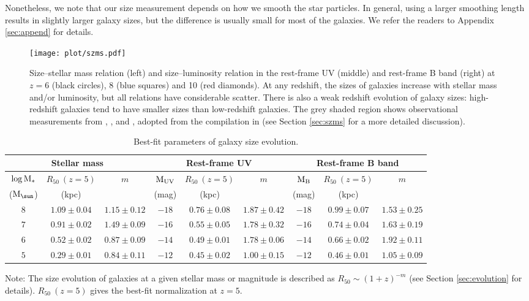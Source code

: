 \documentclass[useAMS,usenatbib]{mn2e}
\newcommand{\Ms}{{\rm M}_{\ast}}
\newcommand{\Msun}{{\rm M}_{\sun}}
\begin{document}
Nonetheless, we note that our size measurement depends on how we smooth the star particles. In general, using a larger smoothing length results in slightly larger galaxy sizes, but the difference is usually small for most of the galaxies. We refer the readers to Appendix \ref{sec:append} for details.

\begin{figure*}
\centering
\texttt{[image: plot/szms.pdf]}
\caption{Size--stellar mass relation (left) and size--luminosity relation in the rest-frame UV (middle) and rest-frame B band (right) at $z=6$ (black circles), 8 (blue squares) and 10 (red diamonds). At any redshift, the sizes of galaxies increase with stellar mass and/or luminosity, but all relations have considerable scatter. There is also a weak redshift evolution of galaxy sizes: high-redshift galaxies tend to have smaller sizes than low-redshift galaxies. The grey shaded region shows observational measurements from \citet{ono.2013:size.evolution.udf12}, \citet{kawamata.2015:hff.size.z6to8}, and \citet{bouwens.2017:small.galaxy.sizes}, adopted from the compilation in \citealt{bouwens.2017:small.galaxy.sizes} (see Section \ref{sec:szms} for a more detailed discussion).}
\label{fig:szms}
\end{figure*}

\begin{table*}
\caption{Best-fit parameters of galaxy size evolution.}
\begin{threeparttable}
\begin{tabular}{ccccccccc}
\hline
\multicolumn{3}{c}{Stellar mass} & \multicolumn{3}{c}{Rest-frame UV} & \multicolumn{3}{c}{Rest-frame B band} \\
\hline
$\log\Ms$ & $R_{50}~(z=5)$ & $m$ & $\rm M_{UV}$ & $R_{50}~(z=5)$ & $m$ & 
$\rm M_B$ & $R_{50}~(z=5)$ & $m$ \\
($\Msun$) & (kpc) & & (mag) & (kpc) & & (mag) & (kpc) & \\
\hline
$8$ & $1.09\pm0.04$ & $1.15\pm0.12$ & $-18$ & $0.76\pm0.08$ & $1.87\pm0.42$ & 
$-18$ & $0.99\pm0.07$ & $1.53\pm0.25$ \\
$7$ & $0.91\pm0.02$ & $1.49\pm0.09$ & $-16$ & $0.55\pm0.05$ & $1.78\pm0.32$ & 
$-16$ & $0.74\pm0.04$ & $1.63\pm0.19$ \\
$6$ & $0.52\pm0.02$ & $0.87\pm0.09$ & $-14$ & $0.49\pm0.01$ & $1.78\pm0.06$ & 
$-14$ & $0.66\pm0.02$ & $1.92\pm0.11$ \\
$5$ & $0.29\pm0.01$ & $0.84\pm0.11$ & $-12$ & $0.45\pm0.02$ & $1.00\pm0.15$ & 
$-12$ & $0.46\pm0.01$ & $1.05\pm0.09$ \\
\hline
\end{tabular}
\begin{tablenotes}
\item Note: The size evolution of galaxies at a given stellar mass or magnitude is described as $R_{50}\sim(1+z)^{-m}$ (see Section \ref{sec:evolution} for details). $R_{50}~(z=5)$ gives the best-fit normalization at $z=5$.
\end{tablenotes}
\end{threeparttable}
\label{tbl:sz}
\end{table*}
\end{document}
